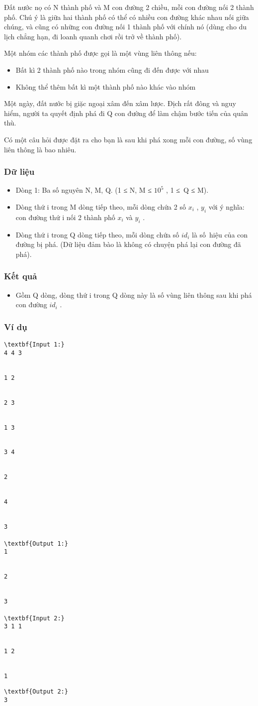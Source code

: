 



   Đất nước nọ có N thành phố và M con đường 2 chiều, mỗi con đường nối 2 thành phố. Chú ý là giữa hai thành phố có thể có nhiều con đường khác nhau nối giữa chúng, và cũng có những con đường nối 1 thành phố với chính nó (dùng cho du lịch chẳng hạn, đi loanh quanh chơi rồi trở về thành phố).  

   Một nhóm các thành phố được gọi là một vùng liên thông nếu:  
\begin{itemize}
	\item     Bất kì 2 thành phố nào trong nhóm cũng đi đến được với nhau   
	\item     Không thể thêm bất kì một thành phố nào khác vào nhóm   
\end{itemize}

   Một ngày, đất nước bị giặc ngoại xâm đến xâm lược. Địch rất đông và nguy hiểm, người ta quyết định phá đi Q con đường để làm chậm bước tiến của quân thù.  

   Có một câu hỏi được đặt ra cho bạn là sau khi phá xong mỗi con đường, số vùng liên thông là bao nhiêu.  

\subsubsection{   Dữ liệu  }
\begin{itemize}
	\item     Dòng 1: Ba số nguyên N, M, Q. (1 ≤ N, M ≤ $10^{5}$    , 1 ≤ Q ≤ M).   
	\item     Dòng thứ i trong M dòng tiếp theo, mỗi dòng chứa 2 số $x_{i}$    , $y_{i}$    với ý nghĩa: con đường thứ i nối 2 thành phố $x_{i}$    và $y_{i}$    .   
	\item     Dòng thứ i trong Q dòng tiếp theo, mỗi dòng chứa số $id_{i}$    là số hiệu của con đường bị phá. (Dữ liệu đảm bào là không có chuyện phá lại con đường đã phá).   
\end{itemize}

\subsubsection{   Kết quả  }
\begin{itemize}
	\item     Gồm Q dòng, dòng thứ i trong Q dòng này là số vùng liên thông sau khi phá con đường $id_{i}$    .   
\end{itemize}

\subsubsection{   Ví dụ  }
\begin{verbatim}
\textbf{Input 1:}
4 4 3


1 2


2 3


1 3


3 4


2


4


3

\textbf{Output 1:}
1


2


3

\textbf{Input 2:}
3 1 1


1 2


1 \end{verbatim}
\begin{verbatim}
\textbf{Output 2:}
3\end{verbatim}
